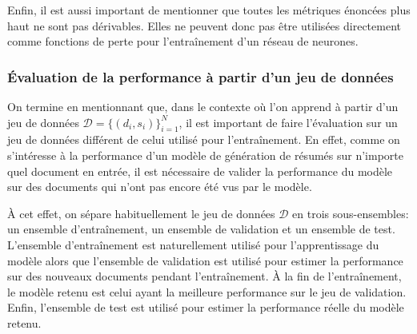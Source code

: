 Enfin, il est aussi important de mentionner que toutes les métriques énoncées 
plus haut ne sont pas dérivables.
Elles ne peuvent donc pas être utilisées directement comme fonctions de perte
pour l'entraînement d'un réseau de neurones.

\subsubsection*{Évaluation de la performance à partir d'un jeu de données}

On termine en mentionnant que, dans le contexte où l'on apprend à partir 
d'un jeu de données $\mathcal{D}=\{(d_i, s_i)\}_{i=1}^N$, il est important 
de faire l'évaluation sur un jeu de données différent de celui utilisé pour l'entraînement.
En effet, comme on s'intéresse à la performance d'un modèle de génération 
de résumés sur n'importe quel document en entrée, il est nécessaire de valider 
la performance du modèle sur des documents qui n'ont pas encore été vus par 
le modèle.

À cet effet, on sépare habituellement le jeu de données $\mathcal{D}$ en trois
sous-ensembles: un ensemble d'entraînement, un ensemble de validation et un ensemble 
de test.
L'ensemble d'entraînement est naturellement utilisé pour l'apprentissage du modèle
alors que l'ensemble de validation est utilisé pour estimer la performance 
sur des nouveaux documents pendant l'entraînement.
À la fin de l'entraînement, le modèle retenu est celui ayant la meilleure performance 
sur le jeu de validation.
Enfin, l'ensemble de test est utilisé pour estimer la performance réelle 
du modèle retenu. 

